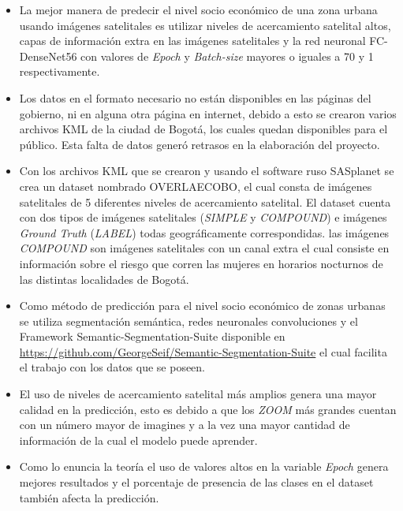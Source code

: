 \begin{itemize}
\item La mejor manera de predecir el nivel socio económico de una zona urbana usando imágenes satelitales es utilizar niveles de acercamiento satelital altos, capas de información extra en las imágenes satelitales y la red neuronal FC-DenseNet56 con valores de \textit{Epoch} y \textit{Batch-size} mayores o iguales a 70 y 1 respectivamente. 

\item Los datos en el formato necesario no están disponibles en las páginas del gobierno, ni en alguna otra página en internet, debido a esto se crearon varios archivos KML de la ciudad de Bogotá, los cuales quedan disponibles para el público. Esta falta de datos generó retrasos en la elaboración del proyecto. 

\item Con los archivos KML que se crearon y usando el software ruso SASplanet se crea un dataset nombrado OVERLAECOBO, el cual consta de imágenes satelitales de 5 diferentes niveles de acercamiento satelital. El dataset cuenta con dos tipos de imágenes satelitales (\textit{SIMPLE} y \textit{COMPOUND}) e imágenes \textit{Ground Truth} (\textit{LABEL}) todas geográficamente correspondidas. las imágenes \textit{COMPOUND} son imágenes satelitales con un canal extra el cual consiste en información sobre el riesgo que corren las mujeres en horarios nocturnos de las distintas localidades de Bogotá. 

\item Como método de predicción para el nivel socio económico de zonas urbanas se utiliza segmentación semántica, redes neuronales convoluciones y el Framework Semantic-Segmentation-Suite disponible en \url{https://github.com/GeorgeSeif/Semantic-Segmentation-Suite} el cual facilita el trabajo con los datos que se poseen. 

\item El uso de niveles de acercamiento satelital más amplios genera una mayor calidad en la predicción, esto es debido a que los \textit{ZOOM} más grandes cuentan con un número mayor de imagines y a la vez una mayor cantidad de información de la cual el modelo puede aprender. 

\item Como lo enuncia la teoría el uso de valores altos en la variable \textit{Epoch} genera mejores resultados y el porcentaje de presencia de las clases en el dataset también afecta la predicción. 
\end{itemize}

